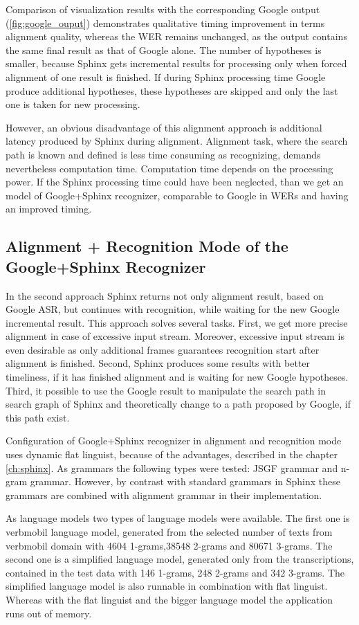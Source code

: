 Comparison of visualization results with the corresponding Google
output (\ref{fig:google_ouput}) demonstrates qualitative timing improvement in terms
alignment quality, whereas the WER remains unchanged, as the output contains
the same final result as that of Google alone. The number of hypotheses is
smaller, because Sphinx gets incremental results for processing only when
forced alignment of one result is finished.  If during Sphinx processing time
Google produce additional hypotheses, these hypotheses are skipped and only the
last one is taken for new processing. 

However, an obvious disadvantage of this alignment approach is additional
latency produced by Sphinx during alignment.
Alignment task, where the search path is known and defined is less time
consuming as recognizing, demands nevertheless computation time.  Computation
time depends on the processing power. If the Sphinx processing time could have
been neglected, than we get an model of Google+Sphinx recognizer,
comparable to Google in WERs and having an improved timing.

\subsection {Alignment + Recognition Mode  of the Google+Sphinx Recognizer}

In the second approach Sphinx returns not only alignment result, based on Google
ASR, but continues with recognition, while waiting for the new Google incremental result. 
This approach solves several tasks. First, we get more precise alignment  in
case of excessive input stream. Moreover, excessive input stream is
even desirable as only additional frames guarantees recognition start after
alignment is finished. Second, Sphinx produces some results with better
timeliness, if it has finished alignment and is waiting for new Google
hypotheses. Third, it possible to use the Google result to manipulate the search
path in search graph of Sphinx and theoretically change to a path proposed by
Google, if this path exist. 

Configuration of Google+Sphinx recognizer in alignment and recognition mode
uses dynamic flat linguist, because of the  advantages, described in the chapter
\ref{ch:sphinx}. As grammars the following types were tested: JSGF grammar
and n-gram grammar.  However, by contrast with
standard grammars in Sphinx these grammars are combined with alignment grammar 
in their implementation. 

As language models two types of language models were
available. The first one is  verbmobil language model, generated from the
selected number of texts from verbmobil domain with  4604 1-grams,38548 2-grams
and 80671 3-grams. The second one is a simplified language model, generated
only from the transcriptions, contained in the test data with 146 1-grams,
248 2-grams and 342 3-grams. The simplified language model is also runnable in
combination with flat linguist. Whereas  with the flat linguist and the bigger language model the 
application runs out of memory. 


